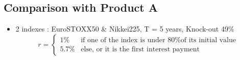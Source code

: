 \subsection{Comparison with Product A}
\begin{frame}
\myframetitle{}
\begin{itemize}
	\item 2 indexes : EuroSTOXX50 \& Nikkei225, T = 5 years, Knock-out 49\% 
	$$
	r = 
	\left \{
	\begin{array}{ll}
    1\%   & \mbox{if one of the index is under 80\% of its initial value} \\
		5.7\% & \mbox{else, or it is the first interest payment}
  \end{array}
	\right.
	$$
\end{itemize}
\end{frame}